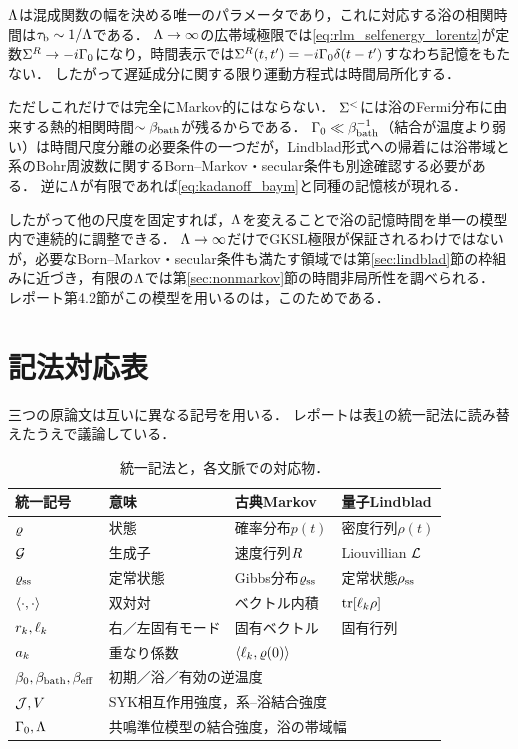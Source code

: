 \documentclass[a4paper,11pt,onecolumn]{jlreq}
\begin{document}
$\Lambda$は混成関数の幅を決める唯一のパラメータであり，これに対応する浴の相関時間は$\tau_{\mathrm{b}}\sim1/\Lambda$である．
$\Lambda\to\infty$の広帯域極限では\eqref{eq:rlm_selfenergy_lorentz}が定数$\Sigma^{R}\to-i\Gamma_0$になり，時間表示では$\Sigma^{R}(t,t')=-i\Gamma_0\delta(t-t')$すなわち記憶をもたない．
したがって遅延成分に関する限り運動方程式は時間局所化する．

ただしこれだけでは完全にMarkov的にはならない．
$\Sigma^{<}$には浴のFermi分布に由来する熱的相関時間$\sim\beta_{\mathrm{bath}}$が残るからである．
$\Gamma_0\ll\beta_{\mathrm{bath}}^{-1}$（結合が温度より弱い）は時間尺度分離の必要条件の一つだが，Lindblad形式への帰着には浴帯域と系のBohr周波数に関するBorn--Markov・secular条件も別途確認する必要がある．
逆に$\Lambda$が有限であれば\eqref{eq:kadanoff_baym}と同種の記憶核が現れる．

したがって他の尺度を固定すれば，$\Lambda$を変えることで浴の記憶時間を単一の模型内で連続的に調整できる．
$\Lambda\to\infty$だけでGKSL極限が保証されるわけではないが，必要なBorn--Markov・secular条件も満たす領域では第\ref{sec:lindblad}節の枠組みに近づき，有限の$\Lambda$では第\ref{sec:nonmarkov}節の時間非局所性を調べられる．
レポート第4.2節がこの模型を用いるのは，このためである．

\section{記法対応表}
\label{sec:notation}

三つの原論文は互いに異なる記号を用いる．
レポートは表\ref{tab:notation}の統一記法に読み替えたうえで議論している．

\begin{table}[htbp]
  \centering
  \caption{統一記法と，各文脈での対応物．}
  \label{tab:notation}
  \small
  \begin{tabular}{@{}llll@{}}
    \toprule
    統一記号 & 意味 & 古典Markov & 量子Lindblad \\
    \midrule
    $\varrho$ & 状態 & 確率分布$p(t)$ & 密度行列$\rho(t)$ \\
    $\mathcal{G}$ & 生成子 & 速度行列$R$ & Liouvillian $\mathcal{L}$ \\
    $\varrho_{\mathrm{ss}}$ & 定常状態 & Gibbs分布$\varrho_{\mathrm{ss}}$ & 定常状態$\rho_{\mathrm{ss}}$ \\
    $\langle \cdot , \cdot \rangle$ & 双対対 & ベクトル内積 & $\tr[\ell_{k}\rho]$ \\
    $r_{k},\ell_{k}$ & 右／左固有モード & 固有ベクトル & 固有行列 \\
    $a_{k}$ & 重なり係数 & \multicolumn{2}{l}{$\langle \ell_{k} , \varrho(0) \rangle$} \\
    $\beta_{0},\beta_{\mathrm{bath}},\beta_{\mathrm{eff}}$ & \multicolumn{3}{l}{初期／浴／有効の逆温度} \\
    $\mathcal{J},V$ & \multicolumn{3}{l}{SYK相互作用強度，系--浴結合強度} \\
    $\Gamma_0,\Lambda$ & \multicolumn{3}{l}{共鳴準位模型の結合強度，浴の帯域幅} \\
    \bottomrule
  \end{tabular}
\end{table}
\end{document}

